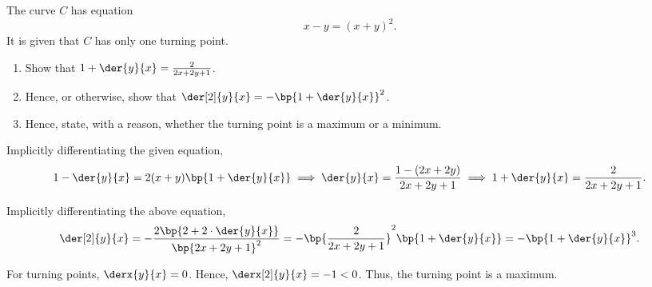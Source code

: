 \clearpage
\begin{problem}
    The curve $C$ has equation \[x - y = (x+y)^2.\] It is given that $C$ has only one turning point.

    \begin{enumerate}
        \item Show that $1 + \der{y}{x} = \frac{2}{2x + 2y + 1}$.
        \item Hence, or otherwise, show that $\der[2]{y}{x} = -\bp{1 + \der{y}{x}}^2$.
        \item Hence, state, with a reason, whether the turning point is a maximum or a minimum.
    \end{enumerate}
\end{problem}
\begin{solution}
    \begin{ppart}
        Implicitly differentiating the given equation, \[1 - \der{y}{x} = 2(x+y)\bp{1 + \der{y}{x}} \implies \der{y}{x} = \frac{1 - (2x + 2y)}{2x + 2y + 1} \implies 1 + \der{y}{x} = \frac{2}{2x+2y+1}.\]
    \end{ppart}
    \begin{ppart}
        Implicitly differentiating the above equation, \[\der[2]{y}{x} = -\frac{2\bp{2 + 2 \cdot \der{y}{x}}}{\bp{2x+2y+1}^2} = -\bp{\frac{2}{2x+2y+1}}^2 \bp{1 + \der{y}{x}} = -\bp{1 + \der{y}{x}}^3.\]
    \end{ppart}
    \begin{ppart}
        For turning points, $\derx{y}{x} = 0$. Hence, $\derx[2]{y}{x} = -1 < 0$. Thus, the turning point is a maximum.
    \end{ppart}
\end{solution}